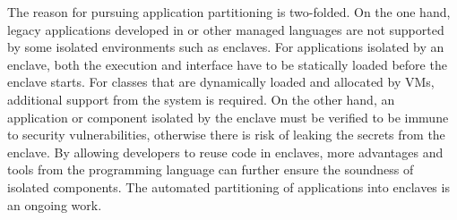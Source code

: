 The reason for pursuing \java{} application partitioning
is two-folded.
On the one hand, legacy applications developed in \java{} or other managed languages
are not supported by
some isolated environments such as \intel{} \sgx{} enclaves.
For applications isolated by an enclave,
both the execution and interface have to be statically loaded
before the enclave starts.
For \java{} classes that are dynamically loaded and allocated by \java{} VMs,
additional support from the system is required.
On the other hand,
an application or component isolated by the enclave must be verified to
be immune to security vulnerabilities,
otherwise there is risk of leaking the secrets from the enclave.
By allowing developers to reuse \java{} code in enclaves{},
more advantages and tools from the programming language can further ensure the soundness of isolated components.
The automated partitioning of \java{} applications into enclaves
is an ongoing work.



%
%

